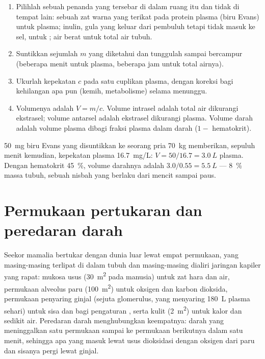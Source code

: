 \begin{method}\label{met:b1:mammal-organization:dilution}
\begin{enumerate}
  \item Pilihlah sebuah penanda yang tersebar di dalam ruang itu dan
        tidak di tempat lain: sebuah zat warna yang terikat pada protein
        plasma (biru Evans) untuk plasma; inulin, gula yang keluar dari
        pembuluh tetapi tidak masuk ke sel, untuk ; air
        berat untuk total air tubuh.
  \item Suntikkan sejumlah $m$ yang diketahui dan tunggulah sampai
        bercampur (beberapa menit untuk plasma, beberapa jam untuk total
        airnya).
  \item Ukurlah kepekatan $c$ pada satu cuplikan plasma, dengan koreksi
        bagi kehilangan apa pun (kemih, metabolisme) selama menunggu.
  \item Volumenya adalah $V = m/c$. Volume intrasel adalah total air
        dikurangi ekstrasel; volume antarsel adalah ekstrasel dikurangi
        plasma. Volume darah adalah volume plasma dibagi fraksi plasma
        dalam darah ($1 - $ hematokrit).
\end{enumerate}
\end{method}

\begin{example}\label{ex:b1:mammal-organization:evansblue}
\qty{50}{mg} biru Evans yang disuntikkan ke seorang pria \qty{70}{kg}
memberikan, sepuluh menit kemudian, kepekatan plasma \qty{16.7}{mg/L}:
$V = 50/16.7 = \qty{3.0}{L}$ plasma. Dengan hematokrit \qty{45}{\%},
volume darahnya adalah $3.0/0.55 = \qty{5.5}{L}$ --- \qty{8}{\%} massa
tubuh, sebuah nisbah yang berlaku dari mencit sampai paus.
\end{example}

\section{Permukaan pertukaran dan peredaran darah}

\begin{proposition}\label{prop:b1:mammal-organization:surfaces}
Seekor mamalia bertukar dengan dunia luar lewat empat permukaan, yang
masing-masing terlipat di dalam tubuh dan masing-masing dialiri jaringan
kapiler yang rapat: mukosa usus (\qty{30}{m^2} pada manusia) untuk zat
hara dan air, permukaan alveolus paru (\qty{100}{m^2}) untuk oksigen dan
karbon dioksida, permukaan penyaring ginjal (sejuta glomerulus, yang
menyaring \qty{180}{L} plasma sehari) untuk sisa dan bagi pengaturan
, serta kulit (\qty{2}{m^2}) untuk kalor dan sedikit
air. Peredaran darah menghubungkan keempatnya: darah yang meninggalkan
satu permukaan sampai ke permukaan berikutnya dalam satu menit, sehingga
apa yang masuk lewat usus dioksidasi dengan oksigen dari paru dan
sisanya pergi lewat ginjal.
\end{proposition}

